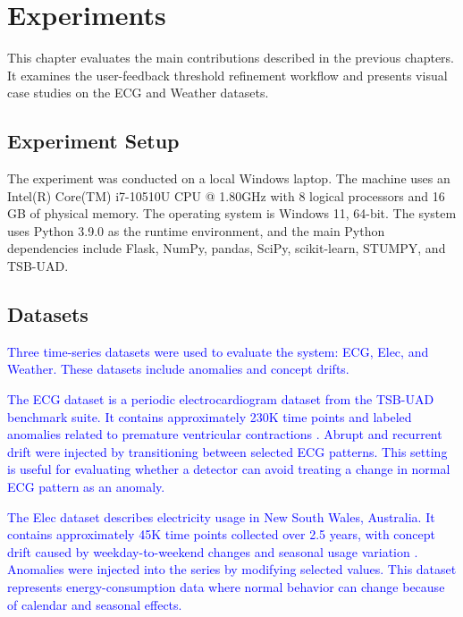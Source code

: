 \chapter{Experiments}

This chapter evaluates the main contributions described in the previous chapters. It examines the user-feedback threshold refinement workflow and presents visual case studies on the ECG and Weather datasets.

\section{Experiment Setup}
The experiment was conducted on a local Windows laptop. The machine uses an Intel(R) Core(TM) i7-10510U CPU @ 1.80GHz with 8 logical processors and 16 GB of physical memory. The operating system is Windows 11, 64-bit. The system uses Python 3.9.0 as the runtime environment, and the main Python dependencies include Flask, NumPy, pandas, SciPy, scikit-learn, STUMPY, and TSB-UAD.


\section{Datasets}

\textcolor{blue}{Three time-series datasets were used to evaluate the system: ECG, Elec, and Weather. These datasets include anomalies and concept drifts.}

\textcolor{blue}{The ECG dataset is a periodic electrocardiogram dataset from the TSB-UAD benchmark suite. It contains approximately 230K time points and labeled anomalies related to premature ventricular contractions \citep{park2025andri,paparrizos2022tsbuad}. Abrupt and recurrent drift were injected by transitioning between selected ECG patterns. This setting is useful for evaluating whether a detector can avoid treating a change in normal ECG pattern as an anomaly.}

\textcolor{blue}{The Elec dataset describes electricity usage in New South Wales, Australia. It contains approximately 45K time points collected over 2.5 years, with concept drift caused by weekday-to-weekend changes and seasonal usage variation \citep{park2025andri,bifet2010moa}. Anomalies were injected into the series by modifying selected values. This dataset represents energy-consumption data where normal behavior can change because of calendar and seasonal effects.}

